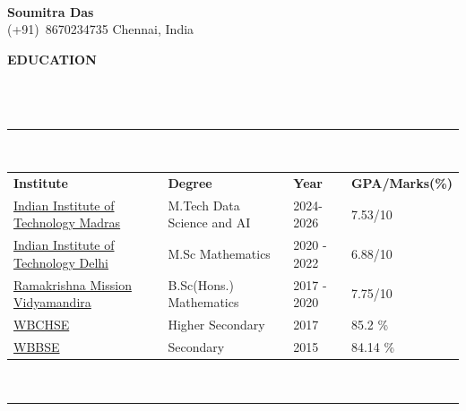 \documentclass[a4paper,10pt]{article}
\newcommand\tab[1][0.5cm]{\hspace*{#1}}
\newcommand{\lsep}{-0.5cm}
\newcommand{\resheading}[1]{{\small \colorbox{mygrey}{\begin{minipage}{0.975\textwidth}{\textbf{#1 \vphantom{p\^{E}}}}\end{minipage}}}}
\begin{document}
\hspace{0.5cm}\\[-0.2cm]
\begin{center}

    \textbf{\huge Soumitra Das} \\
    (+91)\ 8670234735 \tab Chennai, India \\ 

\end{center}

\resheading{\textbf{EDUCATION} }\\[\lsep]
\\
\indent \rule{6.8in}{0.4pt}\\
\indent \begin{tabular}{ l @{\hskip 0.15in} l @{\hskip 0.15in} l @{\hskip 0.15in} l @{\hskip 0.15in} }
\noindent \textbf{Institute} & \textbf{Degree} & \textbf{Year} & \textbf{GPA/Marks(\%)}\\
\href{https://github.com/soumitrapy/resume/blob/main/docs/marksheet_MTech.pdf}{Indian Institute of Technology Madras} & M.Tech Data Science and AI & 2024-2026 & 7.53/10\\
\href{https://github.com/soumitrapy/resume/blob/main/docs/transcript_original.pdf}{Indian Institute of Technology Delhi} & M.Sc Mathematics & 2020 - 2022 & 6.88/10\\
\href{https://github.com/soumitrapy/resume/blob/main/docs/cons_marksheet.pdf}{Ramakrishna Mission Vidyamandira} & B.Sc(Hons.) Mathematics & 2017 - 2020 & 7.75/10\\
\href{https://github.com/soumitrapy/resume/blob/main/docs/hs.pdf}{WBCHSE} & Higher Secondary & 2017 & 85.2 \% \\
\href{https://github.com/soumitrapy/resume/blob/main/docs/secondary.pdf}{WBBSE} & Secondary & 2015 & 84.14 \% \\

\end{tabular}
\\
\indent \rule{6.8in}{0.4pt}
\end{document}
